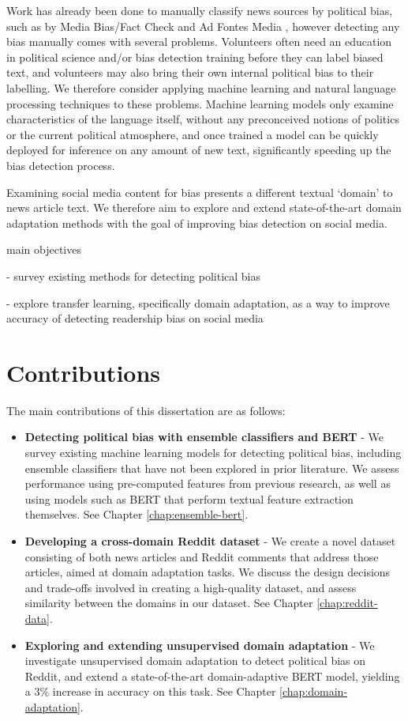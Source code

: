 Work has already been done to manually classify news sources by political bias, such as by Media Bias/Fact Check \cite{mbfc} and Ad Fontes Media \cite{media-bias-chart}, however detecting any bias manually comes with several problems. Volunteers often need an education in political science and/or bias detection training before they can label biased text, and volunteers may also bring their own internal political bias to their labelling. We therefore consider applying machine learning and natural language processing techniques to these problems. Machine learning models only examine characteristics of the language itself, without any preconceived notions of politics or the current political atmosphere, and once trained a model can be quickly deployed for inference on any amount of new text, significantly speeding up the bias detection process.

Examining social media content for bias presents a different textual `domain' to news article text. We therefore aim to explore and extend state-of-the-art domain adaptation methods with the goal of improving bias detection on social media.

main objectives

 - survey existing methods for detecting political bias
 
 - explore transfer learning, specifically domain adaptation, as a way to improve accuracy of detecting readership bias on social media

\section{Contributions}

The main contributions of this dissertation are as follows:

\begin{itemize}
    \item \textbf{Detecting political bias with ensemble classifiers and BERT} - We survey existing machine learning models for detecting political bias, including ensemble classifiers that have not been explored in prior literature. We assess performance using pre-computed features from previous research, as well as using models such as BERT that perform textual feature extraction themselves. See Chapter \ref{chap:ensemble-bert}.
    \item \textbf{Developing a cross-domain Reddit dataset} - We create a novel dataset consisting of both news articles and Reddit comments that address those articles, aimed at domain adaptation tasks. We discuss the design decisions and trade-offs involved in creating a high-quality dataset, and assess similarity between the domains in our dataset. See Chapter \ref{chap:reddit-data}.
    \item \textbf{Exploring and extending unsupervised domain adaptation} - We investigate unsupervised domain adaptation to detect political bias on Reddit, and extend a state-of-the-art domain-adaptive BERT model, yielding a 3\% increase in accuracy on this task. See Chapter \ref{chap:domain-adaptation}.
\end{itemize}

